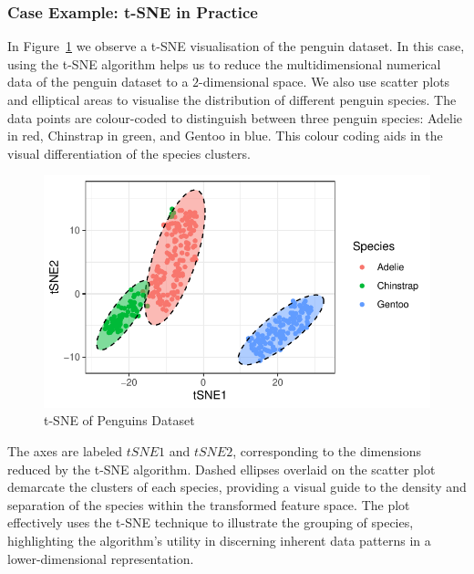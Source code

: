 \documentclass{article}\usepackage[]{graphicx}\usepackage[]{xcolor}
\makeatletter
\def\maxwidth{ %
  \ifdim\Gin@nat@width>\linewidth
    \linewidth
  \else
    \Gin@nat@width
  \fi
}
\newenvironment{knitrout}{}{} %
\numberwithin{equation}{section}
\makeatother
\begin{document}
\subsubsection{Case Example: t-SNE in Practice}

In Figure~\ref{fig:t-SNE} we observe a t-SNE visualisation of the penguin dataset. In this case, using the t-SNE algorithm helps us to reduce the multidimensional numerical data of the penguin dataset to a $2$-dimensional space. We also use scatter plots and elliptical areas to visualise the distribution of different penguin species. The data points are colour-coded to distinguish between three penguin species: Adelie in red, Chinstrap in green, and Gentoo in blue. This colour coding aids in the visual differentiation of the species clusters.\\

\begin{knitrout}\scriptsize
{}\color{fgcolor}\begin{figure}[H]

{\centering \includegraphics[width=\maxwidth]{figure/beamer-t-SNE-1} 

}

\caption[t-SNE of Penguins Dataset]{t-SNE of Penguins Dataset}\label{fig:t-SNE}
\end{figure}

\end{knitrout}

\noindent
The axes are labeled $tSNE1$ and $tSNE2$, corresponding to the dimensions reduced by the t-SNE algorithm. Dashed ellipses overlaid on the scatter plot demarcate the clusters of each species, providing a visual guide to the density and separation of the species within the transformed feature space. The plot effectively uses the t-SNE technique to illustrate the grouping of species, highlighting the algorithm's utility in discerning inherent data patterns in a lower-dimensional representation.\\
\end{document}
